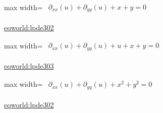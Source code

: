 \documentclass[UTF8,10pt,a4paper,fontset=mac]{ctexart}
\begin{document}
\begin{minipage}{\linewidth}\begin{center}\begin{adjustbox}{max width=\linewidth}$\displaystyle\begin{gathered}\begin{gathered}\partial_{xx}(u)+\partial_{yy}(u)+x+y=0\end{gathered}\end{gathered}$\end{adjustbox}\end{center}{\small\href{https://eqworld.ipmnet.ru/en/solutions/lpde/lpde302.pdf}{eqworld:lpde302}}\par\end{minipage}\par\vspace{6mm}

\begin{minipage}{\linewidth}\begin{center}\begin{adjustbox}{max width=\linewidth}$\displaystyle\begin{gathered}\begin{gathered}\partial_{xx}(u)+\partial_{yy}(u)+u+x+y=0\end{gathered}\end{gathered}$\end{adjustbox}\end{center}{\small\href{https://eqworld.ipmnet.ru/en/solutions/lpde/lpde303.pdf}{eqworld:lpde303}}\par\end{minipage}\par\vspace{6mm}

\begin{minipage}{\linewidth}\begin{center}\begin{adjustbox}{max width=\linewidth}$\displaystyle\begin{gathered}\begin{gathered}\partial_{xx}(u)+\partial_{yy}(u)+x^{2}+y^{2}=0\end{gathered}\end{gathered}$\end{adjustbox}\end{center}{\small\href{https://eqworld.ipmnet.ru/en/solutions/lpde/lpde302.pdf}{eqworld:lpde302}}\par\end{minipage}\par\vspace{6mm}
\end{document}
